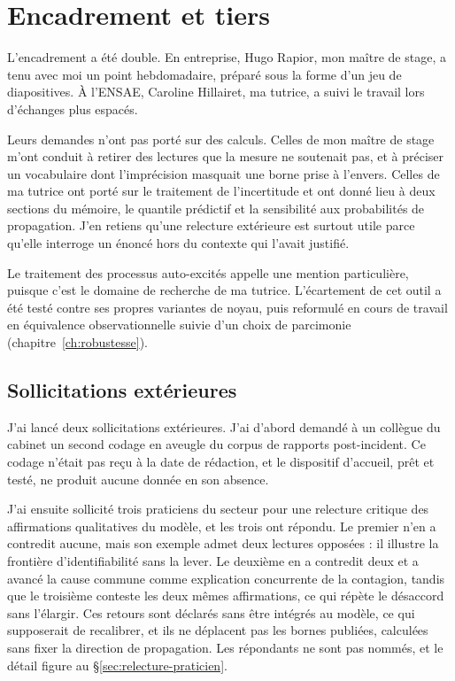\section*{Encadrement et tiers}
\label{ens:encadrement}

L'encadrement a été double. En entreprise, Hugo Rapior, mon maître de stage, a tenu avec moi un
point hebdomadaire, préparé sous la forme d'un jeu de diapositives. À l'ENSAE, Caroline Hillairet,
ma tutrice, a suivi le travail lors d'échanges plus espacés.

Leurs demandes n'ont pas porté sur des calculs. Celles de mon maître de stage m'ont conduit à
retirer des lectures que la mesure ne soutenait pas, et à préciser un vocabulaire dont l'imprécision
masquait une borne prise à l'envers. Celles de ma tutrice ont porté sur le traitement de
l'incertitude et ont donné lieu à deux sections du mémoire, le quantile prédictif et la sensibilité
aux probabilités de propagation. J'en retiens qu'une relecture extérieure est surtout utile parce
qu'elle interroge un énoncé hors du contexte qui l'avait justifié.

Le traitement des processus auto-excités appelle une mention particulière, puisque c'est le domaine
de recherche de ma tutrice. L'écartement de cet outil a été testé contre ses propres variantes de
noyau, puis reformulé en cours de travail en équivalence observationnelle suivie d'un choix de
parcimonie (chapitre~\ref{ch:robustesse}).

\subsection*{Sollicitations extérieures}
J'ai lancé deux sollicitations extérieures. J'ai d'abord demandé à un collègue du cabinet un second
codage en aveugle du corpus de rapports post-incident. Ce codage n'était pas reçu à la date de
rédaction, et le dispositif d'accueil, prêt et testé, ne produit aucune donnée en son absence.

J'ai ensuite sollicité trois praticiens du secteur pour une relecture critique des affirmations
qualitatives du modèle, et les trois ont répondu. Le premier n'en a contredit aucune, mais son
exemple admet deux lectures opposées : il illustre la frontière d'identifiabilité sans la lever. Le
deuxième en a contredit deux et a avancé la cause commune comme explication concurrente de la
contagion, tandis que le troisième conteste les deux mêmes affirmations, ce qui répète le désaccord
sans l'élargir. Ces retours sont déclarés sans être intégrés au modèle, ce qui supposerait de
recalibrer, et ils ne déplacent pas les bornes publiées, calculées sans fixer la direction de
propagation. Les répondants ne sont pas nommés, et le détail figure au
\S\ref{sec:relecture-praticien}.

